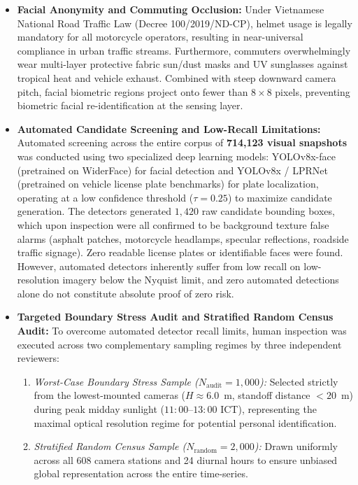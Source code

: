 \documentclass[preprint,12pt]{elsarticle}
\begin{document}
\begin{itemize}
    \item \textbf{Facial Anonymity and Commuting Occlusion:} Under Vietnamese National Road Traffic Law (Decree 100/2019/ND-CP), helmet usage is legally mandatory for all motorcycle operators, resulting in near-universal compliance in urban traffic streams. Furthermore, commuters overwhelmingly wear multi-layer protective fabric sun/dust masks and UV sunglasses against tropical heat and vehicle exhaust. Combined with steep downward camera pitch, facial biometric regions project onto fewer than $8 \times 8$ pixels, preventing biometric facial re-identification at the sensing layer.
    \item \textbf{Automated Candidate Screening and Low-Recall Limitations:} Automated screening across the entire corpus of \textbf{714,123 visual snapshots} was conducted using two specialized deep learning models: YOLOv8x-face (pretrained on WiderFace) for facial detection and YOLOv8x / LPRNet (pretrained on vehicle license plate benchmarks) for plate localization, operating at a low confidence threshold ($\tau = 0.25$) to maximize candidate generation. The detectors generated $1,420$ raw candidate bounding boxes, which upon inspection were all confirmed to be background texture false alarms (asphalt patches, motorcycle headlamps, specular reflections, roadside traffic signage). Zero readable license plates or identifiable faces were found. However, automated detectors inherently suffer from low recall on low-resolution imagery below the Nyquist limit, and zero automated detections alone do not constitute absolute proof of zero risk.
    \item \textbf{Targeted Boundary Stress Audit and Stratified Random Census Audit:} To overcome automated detector recall limits, human inspection was executed across two complementary sampling regimes by three independent reviewers:
    \begin{enumerate}
        \item \textit{Worst-Case Boundary Stress Sample ($N_{\text{audit}} = 1,000$):} Selected strictly from the lowest-mounted cameras ($H \approx 6.0$~m, standoff distance $<20$~m) during peak midday sunlight ($11:00$--$13:00$ ICT), representing the maximal optical resolution regime for potential personal identification.
        \item \textit{Stratified Random Census Sample ($N_{\text{random}} = 2,000$):} Drawn uniformly across all 608 camera stations and 24 diurnal hours to ensure unbiased global representation across the entire time-series.
    \end{enumerate}

\end{itemize}
\end{document}
